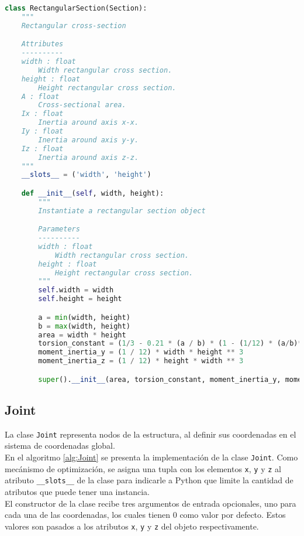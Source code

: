 \begin{lstlisting}[language=Python,caption=Clase \texttt{RectangularSection} implementada en el archivo \texttt{primitives.py}.,label=alg:RectangularSection, frame=single]
class RectangularSection(Section):
    """
    Rectangular cross-section

    Attributes
    ----------
    width : float
        Width rectangular cross section.
    height : float
        Height rectangular cross section.
    A : float
        Cross-sectional area.
    Ix : float
        Inertia around axis x-x.
    Iy : float
        Inertia around axis y-y.
    Iz : float
        Inertia around axis z-z.
    """
    __slots__ = ('width', 'height')

    def __init__(self, width, height):
        """
        Instantiate a rectangular section object

        Parameters
        ----------
        width : float
            Width rectangular cross section.
        height : float
            Height rectangular cross section.
        """
        self.width = width
        self.height = height

        a = min(width, height)
        b = max(width, height)
        area = width * height
        torsion_constant = (1/3 - 0.21 * (a / b) * (1 - (1/12) * (a/b)**4)) * b * a ** 3
        moment_inertia_y = (1 / 12) * width * height ** 3
        moment_inertia_z = (1 / 12) * height * width ** 3

        super().__init__(area, torsion_constant, moment_inertia_y, moment_inertia_z)
\end{lstlisting}

\subsection{Joint}
La clase \verb|Joint| representa nodos de la estructura, al definir sus coordenadas en el sistema de coordenadas global.\\

En el algoritmo \ref{alg:Joint} se presenta la implementación de la clase \verb|Joint|. Como mecánismo de optimización, se asigna una tupla con los elementos \verb|x|, \verb|y| y \verb|z| al atributo \verb|__slots__| de la clase para indicarle a Python que limite la cantidad de atributos que puede tener una instancia.\\

El constructor de la clase recibe tres argumentos de entrada opcionales, uno para cada una de las coordenadas, los cuales tienen $ 0 $ como valor por defecto. Estos valores son pasados a los atributos \verb|x|, \verb|y| y \verb|z| del objeto respectivamente.\\

